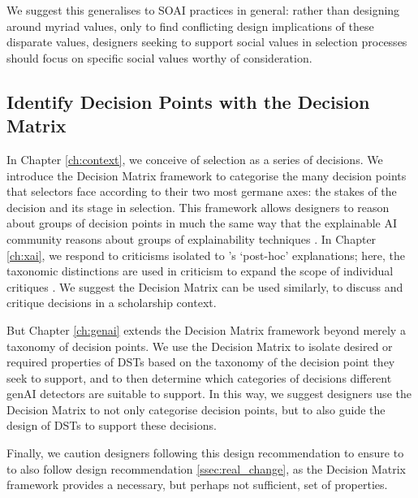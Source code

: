 We suggest this generalises to SOAI practices in general: rather than designing around myriad values, only to find conflicting design implications of these disparate values, designers seeking to support social values in selection processes should focus on specific social values worthy of consideration.

\subsection{Identify Decision Points with the Decision Matrix}
In Chapter \ref{ch:context}, we conceive of selection as a series of decisions. We introduce the Decision Matrix framework to categorise the many decision points that selectors face according to their two most germane axes: the stakes of the decision and its stage in selection. This framework allows designers to reason about groups of decision points in much the same way that the explainable AI community reasons about groups of explainability techniques \cite{ford_play_2020,kumar_problems_2020,doshi-velez_towards_2017,friedrich_taxonomy_2011,molnar_interpretable_2019}. In Chapter \ref{ch:xai}, we respond to criticisms isolated to \textcite{friedrich_taxonomy_2011}'s `post-hoc' explanations; here, the taxonomic distinctions are used in criticism to expand the scope of individual critiques \cite{barocas_hidden_2020,kumar_problems_2020}. We suggest the Decision Matrix can be used similarly, to discuss and critique decisions in a scholarship context.

But Chapter \ref{ch:genai} extends the Decision Matrix framework beyond merely a taxonomy of decision points. We use the Decision Matrix to isolate desired or required properties of DSTs based on the taxonomy of the decision point they seek to support, and to then determine which categories of decisions different genAI detectors are suitable to support. In this way, we suggest designers use the Decision Matrix to not only categorise decision points, but to also guide the design of DSTs to support these decisions.

Finally, we caution designers following this design recommendation to ensure to to also follow design recommendation \ref{ssec:real_change}, as the Decision Matrix framework provides a necessary, but perhaps not sufficient, set of properties.

